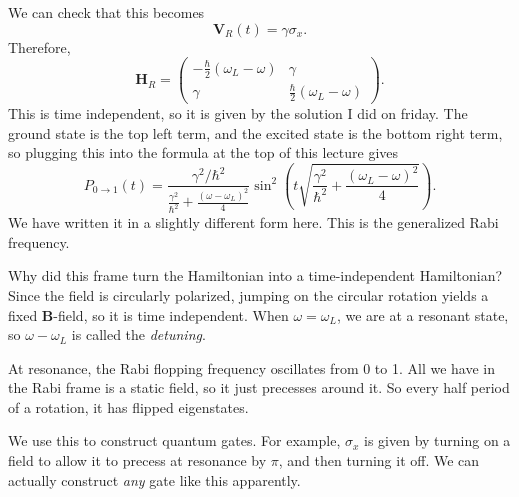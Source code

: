 We can check that this becomes
\[
	\mathbf{V} _R(t)=\gamma \sigma _x
.\]
Therefore,
\[
	\mathbf{H} _R=\begin{pmatrix}
	-\frac{\hbar}{2} (\omega _L-\omega ) & \gamma  \\
	\gamma  & \frac{\hbar}{2} (\omega _L-\omega )
	\end{pmatrix}
.\]
This is time independent, so it is given by the solution I did on friday. The ground state is the top left term, and the excited state is the bottom right term, so plugging this into the formula at the top of this lecture gives
\[
	P_{0\to 1} (t)=\frac{\gamma ^2/\hbar^2}{\frac{\gamma ^2}{\hbar^2} +\frac{(\omega -\omega _L)^2}{4} } \sin ^2 \left(t\sqrt{\frac{\gamma ^2}{\hbar^2} +\frac{(\omega _L-\omega )^2}{4} } \right)
.\]
We have written it in a slightly different form here. This is the generalized Rabi frequency.

Why did this frame turn the Hamiltonian into a time-independent Hamiltonian? Since the field is circularly polarized, jumping on the circular rotation yields a fixed $\mathbf{B} $-field, so it is time independent. When $\omega =\omega _L$, we are at a resonant state, so $\omega -\omega _L$ is called the \emph{detuning}.

At resonance, the Rabi flopping frequency oscillates from 0 to 1. All we have in the Rabi frame is a static field, so it just precesses around it. So every half period of a rotation, it has flipped eigenstates.

We use this to construct quantum gates. For example, $\sigma _x$ is given by turning on a field to allow it to precess at resonance by $\pi $, and then turning it off. We can actually construct \emph{any} gate like this apparently.
